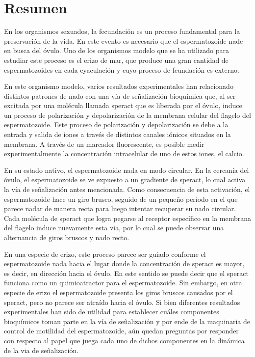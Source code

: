 \begingroup
\let\clearpage\relax
\let\cleardoublepage\relax
\let\cleardoublepage\relax

\chapter*{Resumen}
En los organismos sexuados, la fecundación es un proceso fundamental para la preservación de la vida. En este evento es necesario que el espermatozoide nade en busca del óvulo. Uno de los organismos modelo que se ha utilizado para estudiar este proceso es el erizo de mar, que produce una gran cantidad de espermatozoides en cada eyaculación y cuyo proceso de feundación es externo.

En este organismo modelo, varios resultados experimentales han relacionado distintos patrones de nado con una vía de señalización bioquímica que, al ser excitada por una molécula llamada speract que es liberada por el óvulo, induce un proceso de polarización y depolarización de la membrana celular del flagelo del espermatozoide. Este proceso de polarización y depolarización se debe a la entrada y salida de iones a través de distintos canales iónicos situados en la membrana. A través de un marcador fluorescente, es posible medir experimentalmente la concentración intracelular de uno de estos iones, el calcio.

En su estado nativo, el espermatozoide nada en modo circular. En la cercanía del óvulo, el espermatozoide se ve expuesto a un gradiente de speract, lo cual activa la vía de señalización antes mencionada. Como consecuencia de esta activación, el espermatozoide hace un giro brusco, seguido de un pequeño período en el que parece nadar de manera recta para luego intentar recuperar su nado circular. Cada molécula de speract que logra pegarse al receptor específico en la membrana del flagelo induce nuevamente esta vía, por lo cual se puede observar una alternancia de giros bruscos y nado recto. 

En una especie de erizo, este proceso parece ser guiado conforme el espermatozoide nada hacia el lugar donde la concentración de speract es mayor, es decir, en dirección hacia el óvulo. En este sentido se puede decir que el speract funciona como un quimioatractor para el espermatozoide. Sin embargo, en otra especie de erizo el espermatozoide presenta los giros bruscos causados por el speract, pero no parece ser atraído hacia el óvulo. Si bien diferentes resultados experimentales han sido de utilidad para establecer cuáles componentes bioquímicos toman parte en la vía de señalización y por ende de la maquinaria de control de motilidad del espermatozoide, aún quedan preguntas por responder con respecto al papel que juega cada uno de dichos componentes en la dinámica de la via de señalización. 

